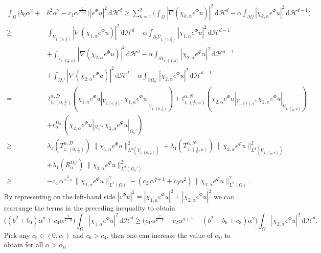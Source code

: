 \documentclass[11pt,oneside,reqno,a4paper]{amsart}
\newcommand{\dd}{\mathrm{d}}
\renewcommand{\H}{\mathcal{H}}
\theoremstyle{definition}
\begin{document}
\begin{align*}
\int_{\Omega}(b_0\alpha^2+&b^2\alpha^2-c_1\alpha^{\frac{2}{2-q}})|e^{\Phi}u|^2\, \dd \H^d\ge \sum_{k=1}^2\bigg(\int_{\Omega}|\nabla(\chi_{k,\alpha}e^{\Phi}u)|^2\, \dd \H^d-\alpha\int_{\partial\Omega}|\chi_{k,\alpha}e^{\Phi}u|^2\,\dd \H^{d-1}\bigg)
\\
\ge&\int_{V_{1,(0,\frac{2}{\alpha})}}|\nabla(\chi_{1,\alpha}e^{\Phi}u)|^2\, \dd \H^d-\alpha\int_{\partial_0 V_{1,(0,\frac{2}{\alpha})}}|\chi_{1,\alpha}e^{\Phi}u|^2\,\dd \H^{d-1}
\\
&+\int_{V_{1,(\frac{1}{\alpha},a)}}|\nabla(\chi_{2,\alpha}e^{\Phi}u)|^2\, \dd \H^d-\alpha\int_{\partial V_{1,(\frac{1}{\alpha},a)}}|\chi_{2,\alpha}e^{\Phi}u|^2\, \dd \H^{d-1}
\\
&+\int_{\Omega_a'}|\nabla(\chi_{2,\alpha}e^{\Phi}u)|^2\, \dd \H^d-\alpha\int_{\partial \Omega_a'}|\chi_{2,\alpha}e^{\Phi}u|^2\, \dd \H^{d-1}
\\
=&\, t^{\alpha,D}_{1,(0,\frac{2}{\alpha})}(\chi_{1,\alpha}e^{\Phi}u|_{V_{1,(0,\frac{2}{\alpha})}},\chi_{1,\alpha}e^{\Phi}u|_{V_{1,(0,\frac{2}{\alpha})}})+t^{\alpha,N}_{1,(\frac{1}{\alpha},a)}(\chi_{2,\alpha}e^{\Phi}u|_{V_{1,(\frac{1}{\alpha}),a}},\chi_{2,\alpha}e^{\Phi}u|_{V_{1,(\frac{1}{\alpha},a)}})
\\
&+r^{\Omega_a'}_\alpha(\chi_{2,\alpha}e^{\Phi}u|_{\Omega_a'},\chi_{2,\alpha}e^{\Phi}u|_{\Omega_a'})
\\
\ge& \lambda_1(T_{1,(0,\frac{2}{\alpha})}^{\alpha,D})\ \|\chi_{1,\alpha}e^{\Phi}u\|^2_{L^2(V_{1,(0,\frac{2}{\alpha})})}+\lambda_1(T_{1,(\frac{1}{\alpha},a)}^{\alpha,N})\ \|\chi_{2,\alpha}e^{\Phi}u\|^2_{L^2(V_{1,(\frac{1}{\alpha},a)})}
\\
&+\lambda_1(R^{\Omega_a'}_\alpha) \ \|\chi_{2,\alpha}e^{\Phi}u\|^2_{L^2(\Omega_a')}
\\
\ge& -c_4\, \alpha^{\frac{2}{2-q}} \, \|\chi_{1,\alpha}e^{\Phi}u\|^2_{L^2(\Omega)}-(c_2\, \alpha^{q+1}+c_3 \alpha^2) \, \|\chi_{2,\alpha}e^{\Phi}u\|^2_{L^2(\Omega)}.
\end{align*} 
By representing on the left-hand side $|e^{\Phi}u|^2=|\chi_{1,\alpha}e^{\Phi}u|^2+|\chi_{2,\alpha}e^{\Phi}u|^2$
we can rearrange the terms in the preceding inequality to obtain
\[
\big((b^2+b_0)\alpha^2+c_4\alpha^{\frac{2}{2-q}}\big)\int_{\Omega}|\chi_{1,\alpha}e^{\Phi}u|^2\, \dd \H^d
\ge \big(c_1\alpha^{\frac{2}{2-q}}-c_2 \alpha^{q+1}-(b^2+b_0+c_3)\alpha^2\big)\int_{\Omega}|\chi_{2,\alpha}e^{\Phi}u|^2\,\dd \H^d.
\]
Pick any $c_5\in (0,c_1)$ and $c_6>c_4$, then one can increase the value of $\alpha_0$
to obtain for all $\alpha>\alpha_0$
\end{document}
